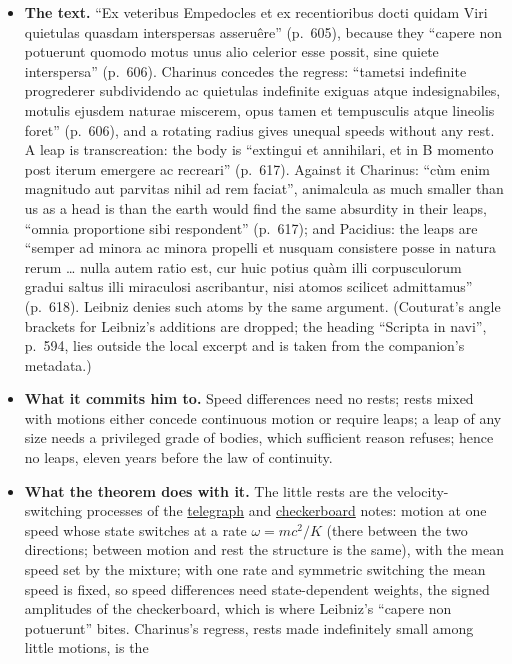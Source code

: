 \documentclass[11pt,a4paper]{article}
\newcommand{\tightlist}{\setlength{\itemsep}{0pt}\setlength{\parskip}{0pt}}
\begin{document}
\begin{itemize}
\tightlist
\item
  \textbf{The text.} ``Ex veteribus Empedocles et ex recentioribus docti
  quidam Viri quietulas quasdam interspersas asseruêre'' (p.~605),
  because they ``capere non potuerunt quomodo motus unus alio celerior
  esse possit, sine quiete interspersa'' (p.~606). Charinus concedes the
  regress: ``tametsi indefinite progrederer subdividendo ac quietulas
  indefinite exiguas atque indesignabiles, motulis ejusdem naturae
  miscerem, opus tamen et tempusculis atque lineolis foret'' (p.~606),
  and a rotating radius gives unequal speeds without any rest. A leap is
  transcreation: the body is ``extingui et annihilari, et in B momento
  post iterum emergere ac recreari'' (p.~617). Against it Charinus:
  ``cùm enim magnitudo aut parvitas nihil ad rem faciat'', animalcula as
  much smaller than us as a head is than the earth would find the same
  absurdity in their leaps, ``omnia proportione sibi respondent''
  (p.~617); and Pacidius: the leaps are ``semper ad minora ac minora
  propelli et nusquam consistere posse in natura rerum \ldots{} nulla
  autem ratio est, cur huic potius quàm illi corpusculorum gradui saltus
  illi miraculosi ascribantur, nisi atomos scilicet admittamus''
  (p.~618). Leibniz denies such atoms by the same argument. (Couturat's
  angle brackets for Leibniz's additions are dropped; the heading
  ``Scripta in navi'', p.~594, lies outside the local excerpt and is
  taken from the companion's metadata.)
\item
  \textbf{What it commits him to.} Speed differences need no rests;
  rests mixed with motions either concede continuous motion or require
  leaps; a leap of any size needs a privileged grade of bodies, which
  sufficient reason refuses; hence no leaps, eleven years before the law
  of continuity.
\item
  \textbf{What the theorem does with it.} The little rests are the
  velocity-switching processes of the
  \href{telegraph-return-bridge.md}{telegraph} and
  \href{checkerboard-dynamics.md}{checkerboard} notes: motion at one
  speed whose state switches at a rate \(\omega=mc^2/K\) (there between
  the two directions; between motion and rest the structure is the
  same), with the mean speed set by the mixture; with one rate and
  symmetric switching the mean speed is fixed, so speed differences need
  state-dependent weights, the signed amplitudes of the checkerboard,
  which is where Leibniz's ``capere non potuerunt'' bites. Charinus's
  regress, rests made indefinitely small among little motions, is the

\end{itemize}
\end{document}
